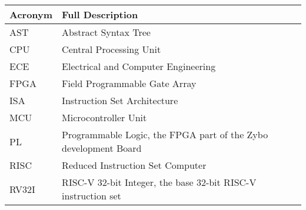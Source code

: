 \begin{table}[H]
	\begin{tabularx}{\textwidth}{| a | x |}
		\hline
		\textbf{Acronym} & \textbf{Full Description}                                       \\
		\hline
		AST              & Abstract Syntax Tree                                            \\
		CPU              & Central Processing Unit                                         \\
		ECE              & Electrical and Computer Engineering                             \\
		FPGA             & Field Programmable Gate Array                                   \\
		ISA              & Instruction Set Architecture                                    \\
		MCU              & Microcontroller Unit                                            \\
		PL               & Programmable Logic, the FPGA part of the Zybo development Board \\
		RISC             & Reduced Instruction Set Computer                                \\
		RV32I            & RISC-V 32-bit Integer, the base 32-bit RISC-V instruction set   \\
		\hline
	\end{tabularx}
\end{table}

